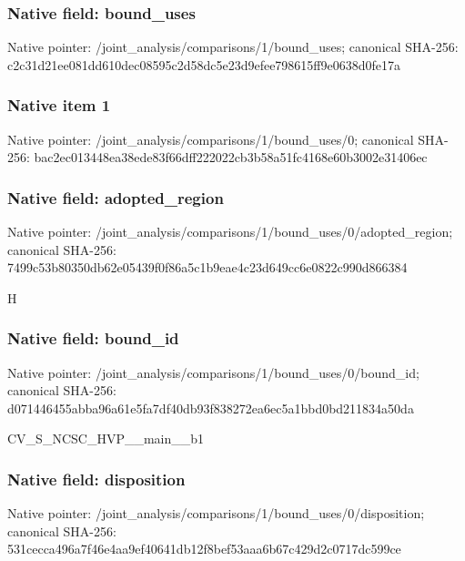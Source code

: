 \documentclass[10pt,a4paper]{article}
\begin{document}
\subsubsection{Native field: bound\_\allowbreak{}uses}
Native pointer: /joint\_\allowbreak{}analysis/comparisons/1/bound\_\allowbreak{}uses; canonical SHA-256: c2c31d21ee081dd610dec08595c2d58dc5e23d9efee798615ff9e0638d0fe17a

\subsubsection{Native item 1}
Native pointer: /joint\_\allowbreak{}analysis/comparisons/1/bound\_\allowbreak{}uses/0; canonical SHA-256: bac2ec013448ea38ede83f66dff222022cb3b58a51fc4168e60b3002e31406ec

\subsubsection{Native field: adopted\_\allowbreak{}region}
Native pointer: /joint\_\allowbreak{}analysis/comparisons/1/bound\_\allowbreak{}uses/0/adopted\_\allowbreak{}region; canonical SHA-256: 7499c53b80350db62e05439f0f86a5c1b9eae4c23d649cc6e0822c990d866384

\begingroup\raggedright\sloppy H\par\endgroup

\subsubsection{Native field: bound\_\allowbreak{}id}
Native pointer: /joint\_\allowbreak{}analysis/comparisons/1/bound\_\allowbreak{}uses/0/bound\_\allowbreak{}id; canonical SHA-256: d071446455abba96a61e5fa7df40db93f838272ea6ec5a1bbd0bd211834a50da

\begingroup\raggedright\sloppy CV\_\allowbreak{}S\_\allowbreak{}NCSC\_\allowbreak{}HVP\_\allowbreak{}\_\allowbreak{}main\_\allowbreak{}\_\allowbreak{}b1\par\endgroup

\subsubsection{Native field: disposition}
Native pointer: /joint\_\allowbreak{}analysis/comparisons/1/bound\_\allowbreak{}uses/0/disposition; canonical SHA-256: 531cecca496a7f46e4aa9ef40641db12f8bef53aaa6b67c429d2c0717dc599ce
\end{document}
